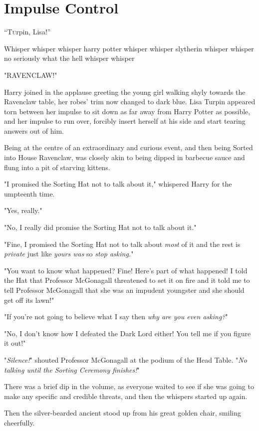 \chapter{Impulse Control}

\lettrine{“T}urpin, Lisa!''

\quad\quad
Whisper whisper whisper harry potter whisper whisper slytherin whisper whisper
no seriously what the hell whisper whisper

"RAVENCLAW!"

Harry joined in the applause greeting the young girl walking shyly towards the
Ravenclaw table, her robes' trim now changed to dark blue. Lisa Turpin appeared
torn between her impulse to sit down as far away from Harry Potter as possible,
and her impulse to run over, forcibly insert herself at his side and start
tearing answers out of him.

Being at the centre of an extraordinary and curious event, and then being
Sorted into House Ravenclaw, was closely akin to being dipped in barbecue sauce
and flung into a pit of starving kittens.

"I promised the Sorting Hat not to talk about it," whispered Harry for the
umpteenth time.

"Yes, really."

"No, I really did promise the Sorting Hat not to talk about it."

"Fine, I promised the Sorting Hat not to talk about \emph{most} of it and the
rest is \emph{private} just like \emph{yours was} so \emph{stop asking.}"

"You want to know what happened? Fine! Here's part of what happened! I told the
Hat that Professor McGonagall threatened to set it on fire and it told me to
tell Professor McGonagall that she was an impudent youngster and she should get
off its lawn!"

"If you're not going to believe what I say then \emph{why are you even asking?}"

"No, I don't know how I defeated the Dark Lord either! You tell me if you
figure it out!"

"\emph{Silence!}" shouted Professor McGonagall at the podium of the Head Table.
"\emph{No talking until the Sorting Ceremony finishes!}"

There was a brief dip in the volume, as everyone waited to see if she was going
to make any specific and credible threats, and then the whispers started up
again.

Then the silver-bearded ancient stood up from his great golden chair, smiling
cheerfully.

